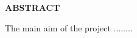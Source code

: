 \documentclass[12pt,a4wide]{report}
\theoremstyle{plain}
\theoremstyle{definition}
\theoremstyle{remark}
\begin{document}
\begin{center}
{\Large{\bf{ABSTRACT}}}
\end{center}


The main aim of the project ........

\clearpage



\tableofcontents
\clearpage
\listoffigures
\listoftables


\newpage

\setcounter{page}{1}














\nocite{golub} \nocite{gerla}\nocite{m1}\nocite{chang}


\end{document}
